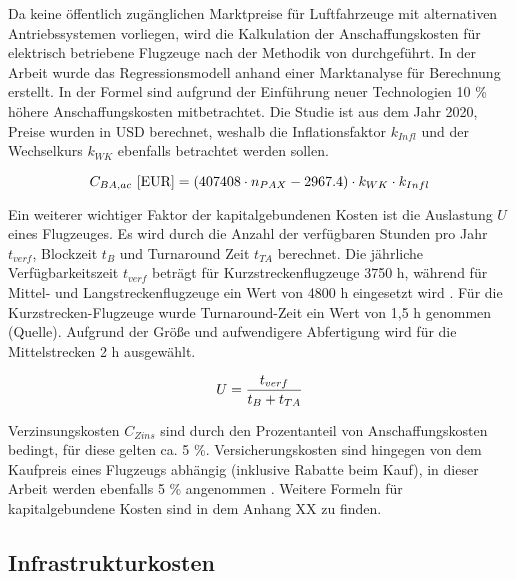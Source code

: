Da keine öffentlich zugänglichen Marktpreise für Luftfahrzeuge mit alternativen Antriebssystemen vorliegen, 
wird die Kalkulation der Anschaffungskosten für elektrisch betriebene Flugzeuge nach der Methodik von \cite{monjon2020conceptual} durchgeführt. 
In der Arbeit wurde das Regressionsmodell anhand einer Marktanalyse für Berechnung erstellt. 
In der Formel sind aufgrund der Einführung neuer Technologien 10 \% höhere Anschaffungskosten mitbetrachtet. 
Die Studie ist aus dem Jahr 2020, Preise wurden in USD berechnet, weshalb die Inflationsfaktor $k_{Infl}$ und
der Wechselkurs $k_{WK}$ ebenfalls betrachtet werden sollen.

\begin{equation}
   {C_{BA,ac} ~[\text{EUR}]} = (407408 \cdot n_{PAX} - 2967.4) \cdot k_{WK} \cdot {k_{Infl}}\\
   \label{price BA}
\end{equation}

Ein weiterer wichtiger Faktor der kapitalgebundenen Kosten ist die Auslastung $U$ eines Flugzeuges. Es wird durch die Anzahl 
der verfügbaren Stunden pro Jahr $t_{verf}$, Blockzeit $t_B$ und Turnaround Zeit $t_{TA}$ berechnet. 
Die jährliche Verfügbarkeitszeit $t_{verf}$ beträgt für Kurzstreckenflugzeuge 3750 h, 
während für Mittel- und Langstreckenflugzeuge ein Wert von 4800 h eingesetzt wird \cite{scholz_design_evaluation_doc}. Für die Kurzstrecken-Flugzeuge 
wurde Turnaround-Zeit ein Wert von 1,5 h genommen (Quelle). Aufgrund der Größe und aufwendigere Abfertigung wird für die Mittelstrecken 2 h ausgewählt.

\begin{equation}
   U = \frac{t_{verf}}{t_B + t_{TA}} \\
   \label{utilisation}
\end{equation}

Verzinsungskosten $C_{Zins}$ sind durch den Prozentanteil von Anschaffungskosten bedingt, für diese gelten ca. 5 \%. 
Versicherungskosten sind hingegen von dem Kaufpreis eines Flugzeugs abhängig (inklusive Rabatte beim Kauf), 
in dieser Arbeit werden ebenfalls 5 \% angenommen \cite{scholz_design_evaluation_doc}. 
Weitere Formeln für kapitalgebundene Kosten sind in dem Anhang XX zu finden.
%
\subsection{Infrastrukturkosten}

